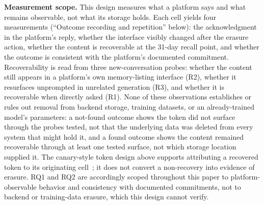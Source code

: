 \documentclass[conference,compsoc]{IEEEtran}
\begin{document}
\textbf{Measurement scope.} This design measures what a platform says and
what remains observable, not what its storage holds. Each cell yields four
measurements (``Outcome recording and repetition'' below): the
acknowledgment in the platform's reply, whether the interface visibly
changed after the erasure action, whether the content is recoverable at
the 31-day recall point, and whether the outcome is consistent with the
platform's documented commitment. Recoverability is read from three
new-conversation probes: whether the content still appears in a platform's
own memory-listing interface (R2), whether it resurfaces unprompted in
unrelated generation (R3), and whether it is recoverable when directly
asked (R1). None of these observations establishes or
rules out removal from backend storage, training datasets, or an
already-trained model's parameters: a not-found outcome shows
the token did not surface through the probes tested, not that the
underlying data was deleted from every system that might hold it, and a
found outcome shows the content remained recoverable through at
least one tested surface, not which storage location supplied it. The
canary-style token design above supports attributing a recovered token to
its originating cell~\cite{carlini2019secret}; it does not convert a
non-recovery into evidence of erasure. RQ1 and RQ2 are accordingly scoped
throughout this paper to platform-observable behavior and consistency with
documented commitments, not to backend or training-data erasure, which
this design cannot verify.
\end{document}
